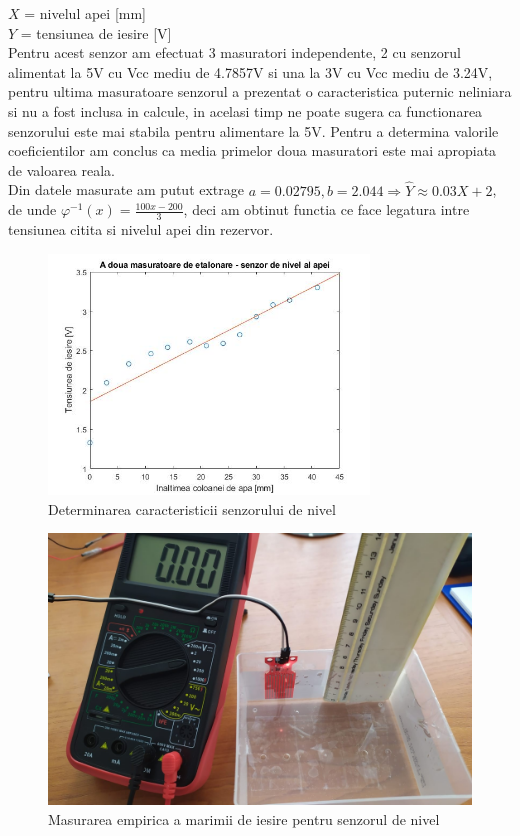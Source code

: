 \documentclass[12pt]{article}
\begin{document}
$X$ = nivelul apei [mm]\\
$Y$ = tensiunea de iesire [V] \\
Pentru acest senzor am efectuat 3 masuratori independente, 2 cu senzorul alimentat la 5V cu Vcc mediu de 4.7857V si una la 3V cu Vcc mediu de 3.24V, pentru ultima masuratoare senzorul a prezentat o caracteristica puternic neliniara si nu a fost inclusa in calcule, in acelasi timp ne poate sugera ca functionarea senzorului este mai stabila pentru alimentare la 5V. Pentru a determina valorile coeficientilor am conclus ca media primelor doua masuratori este mai apropiata de valoarea reala. \\
Din datele masurate am putut extrage $a = 0.02795, b = 2.044 \Rightarrow \hat{Y} \approx 0.03X + 2$, de unde $\varphi^{-1}(x) = \frac{100x-200}{3}$, deci am obtinut functia ce face legatura intre tensiunea citita si nivelul apei din rezervor. 

\begin{figure}[H]
\centering
\includegraphics[width=0.76\textwidth]{Pictures/nivelmas.jpg}
\caption{Determinarea caracteristicii senzorului de nivel}
\end{figure}

\newpage

\begin{figure}[H]
\centering
\includegraphics[width=\textwidth]{Pictures/nivelemp.jpeg}
\caption{Masurarea empirica a marimii de iesire pentru senzorul de nivel}
\end{figure}
\end{document}
